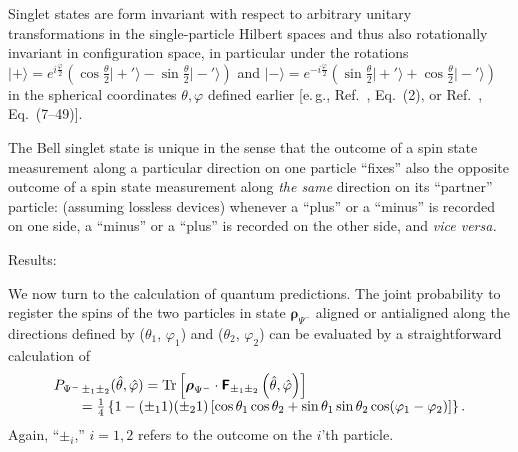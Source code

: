 {Singlet states are form invariant with respect to arbitrary unitary
transformations in the single-particle Hilbert spaces and thus
also rotationally invariant in configuration space,
in particular under the rotations
$
\vert + \rangle =
e^{ i{\frac{\varphi}{2}} }
\left(
\cos \frac{\theta}{2} \vert +'  \rangle
-
\sin \frac{\theta}{2} \vert -'   \rangle
\right)
$
and
$
\vert - \rangle =
e^{ -i{\frac{\varphi}{2}} }
\left(
\sin \frac{\theta}{2} \vert +'   \rangle
+
\cos \frac{\theta}{2} \vert -'  \rangle
\right)
$
in the spherical coordinates $\theta , \varphi$ defined earlier
[e.\,g., Ref.~\cite{krenn1}, Eq.~(2), or Ref.~\cite{ba-89}, Eq.~(7--49)].

The Bell singlet state is unique in the sense that the outcome of a spin state measurement
along a particular direction on one particle ``fixes'' also the opposite outcome of a spin state measurement
along {\em the same} direction on its ``partner'' particle: (assuming lossless devices)
whenever a ``plus'' or a ``minus'' is recorded on one side,
a ``minus'' or a ``plus'' is recorded on the other side, and {\it vice versa.}




{Results:}

We now turn to the calculation of quantum predictions.
The joint probability to register the spins of the two particles
in state ${\boldsymbol{\rho}}_{{\Psi^-}}$
aligned or antialigned along the directions defined by
($\theta_1$, $\varphi_1 $) and
($\theta_2$, $\varphi_2 $)
can be evaluated by a straightforward calculation of
\begin{equation}
\begin{array}{l}
P_{{ {\Psi^-}}\,\pm_1 \pm_2 } ({\hat \theta},{\hat \varphi} )=
{\rm Tr}\left[{\boldsymbol{\rho}}_{ {\Psi^-}} \cdot \textsf{\textbf{F}}_{\pm_1 \pm_2 } \left({\hat \theta},{\hat \varphi} \right)\right] \\
\qquad
=\frac{1}{4} \left\{ 1-(\pm_1 1)( \pm_2 1) \left[\cos \theta_1 \cos \theta_2 + \sin \theta_1 \sin \theta_2 \cos (\varphi_1-\varphi_2) \right]\right\}
.
\end{array}
\end{equation}
Again, ``$\pm_i$,'' $i=1,2$ refers to the outcome on the $i$'th particle.

}
